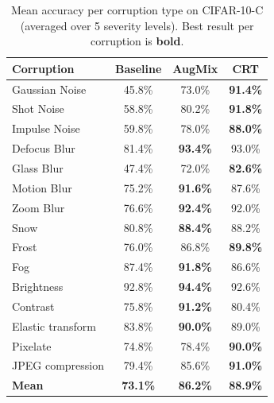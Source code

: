 \documentclass[10pt,twocolumn]{article}
\begin{document}
\begin{table}[h]
\centering
\small
\caption{Mean accuracy per corruption type on CIFAR-10-C (averaged over 5 severity levels). Best result per corruption is \textbf{bold}.}
\label{tab:full_corruption}
\begin{tabular}{lccc}
\toprule
\textbf{Corruption} & \textbf{Baseline} & \textbf{AugMix} & \textbf{CRT} \\
\midrule
Gaussian Noise  & 45.8\% & 73.0\% & \textbf{91.4\%} \\
Shot Noise      & 58.8\% & 80.2\% & \textbf{91.8\%} \\
Impulse Noise   & 59.8\% & 78.0\% & \textbf{88.0\%} \\
Defocus Blur    & 81.4\% & \textbf{93.4\%} & 93.0\% \\
Glass Blur      & 47.4\% & 72.0\% & \textbf{82.6\%} \\
Motion Blur     & 75.2\% & \textbf{91.6\%} & 87.6\% \\
Zoom Blur       & 76.6\% & \textbf{92.4\%} & 92.0\% \\
Snow            & 80.8\% & \textbf{88.4\%} & 88.2\% \\
Frost           & 76.0\% & 86.8\% & \textbf{89.8\%} \\
Fog             & 87.4\% & \textbf{91.8\%} & 86.6\% \\
Brightness      & 92.8\% & \textbf{94.4\%} & 92.6\% \\
Contrast        & 75.8\% & \textbf{91.2\%} & 80.4\% \\
Elastic transform        & 83.8\% & \textbf{90.0\%} & 89.0\% \\
Pixelate        & 74.8\% & 78.4\% & \textbf{90.0\%} \\
JPEG compression           & 79.4\% & 85.6\% & \textbf{91.0\%} \\
\midrule
\textbf{Mean}   & \textbf{73.1\%} & \textbf{86.2\%} & \textbf{88.9\%} \\
\bottomrule
\end{tabular}
\end{table}
\end{document}
